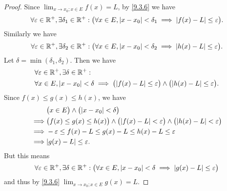 \begin{proof}
  Since \(\lim_{x \to x_0 ; x \in E} f(x) = L\), by \cref{9.3.6} we have
  \[
    \forall \varepsilon \in \mathbb{R}^+, \exists \delta_1 \in \mathbb{R}^+ : \big(\forall x \in E, \left\lvert x - x_0\right\rvert < \delta_1 \implies \left\lvert f(x) - L\right\rvert \leq \varepsilon\big).
  \]
  Similarly we have
  \[
    \forall \varepsilon \in \mathbb{R}^+, \exists \delta_2 \in \mathbb{R}^+ : \big(\forall x \in E, \left\lvert x - x_0\right\rvert < \delta_2 \implies \left\lvert h(x) - L\right\rvert \leq \varepsilon\big).
  \]
  Let \(\delta = \min(\delta_1, \delta_2)\).
  Then we have
  \begin{align*}
     & \forall \varepsilon \in \R^+, \exists \delta \in \R^+ :                                                                                     \\
     & \forall x \in E, \abs{x - x_0} < \delta \implies \big(\abs{f(x) - L} \leq \varepsilon\big) \land \big(\abs{h(x) - L} \leq \varepsilon\big).
  \end{align*}
  Since \(f(x) \leq g(x) \leq h(x)\), we have
  \begin{align*}
             & \big(x \in E\big) \land \big(\abs{x - x_0} < \delta\big)                                                                     \\
    \implies & \big(f(x) \leq g(x) \leq h(x)\big) \land \big(\abs{f(x) - L} < \varepsilon\big) \land \big(\abs{h(x) - L} < \varepsilon\big) \\
    \implies & -\varepsilon \leq f(x) - L \leq g(x) - L \leq h(x) - L \leq \varepsilon                                                      \\
    \implies & \abs{g(x) - L} \leq \varepsilon.
  \end{align*}
  But this means
  \[
    \forall \varepsilon \in \mathbb{R}^+, \exists \delta \in \mathbb{R}^+ : \big(\forall x \in E, \left\lvert x - x_0\right\rvert < \delta \implies \left\lvert g(x) - L\right\rvert \leq \varepsilon\big)
  \]
  and thus by \cref{9.3.6} \(\lim_{x \to x_0 ; x \in E} g(x) = L\).
\end{proof}
